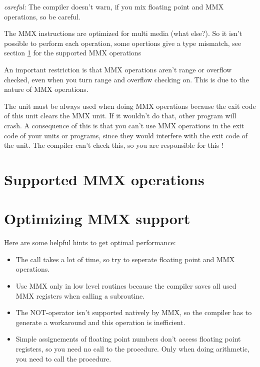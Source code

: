 \documentclass{report}
\begin{document}
{\em careful:} The compiler doesn't warn, if you mix floating point and
MMX operations, so be careful.

The MMX instructions are optimized for multi media (what else?).
So it isn't possible to perform each operation, some opertions
give a type mismatch, see section \ref {se:SupportedMMX} for the supported
MMX operations

An important restriction is that MMX operations aren't range or overflow
checked, even when you turn range and overflow checking on. This is due to
the nature of MMX operations.

The  unit must be always used when doing MMX operations
because the exit code of this unit clears the MMX unit. If it wouldn't do
that, other program will crash. A consequence of this is that you can't use
MMX operations in the exit code of your units or programs, since they would
interfere  with the exit code of the  unit. The compiler can't
check this, so you are responsible for this !

\section{Supported MMX operations}
\label{se:SupportedMMX}



\section{Optimizing MMX support}
\label{se:OptimizingMMX}
Here are some helpful hints to get optimal performance:
\begin{itemize}
\item The  call takes a lot of time, so try to seperate floating
point and MMX operations.
\item Use MMX only in low level routines because the compiler
  saves all used MMX registers when calling a subroutine.
\item The NOT-operator isn't supported natively by MMX, so the
  compiler has to generate a workaround and this operation
  is inefficient.
\item Simple assignements of floating point numbers don't access
  floating point registers, so you need no call to the 
  procedure. Only when doing arithmetic, you need to call the 
procedure.
\end{itemize}


\end{document}
